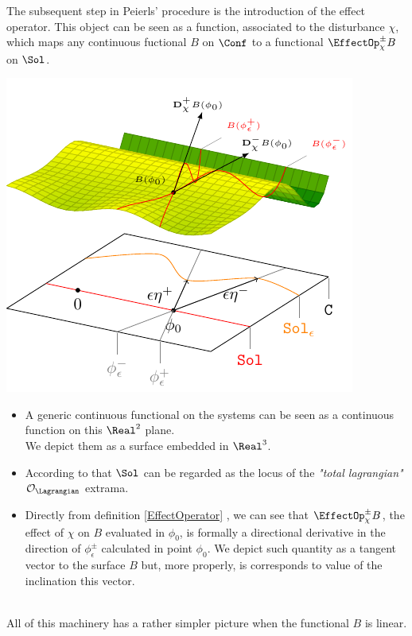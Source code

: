 \documentclass[Main]{subfiles}
\begin{document}
		The subsequent step in Peierls' procedure is the introduction of the effect operator. 
		This object can be seen as a function, associated to the disturbance $\chi$, which maps any continuous fuctional $B$ on $\Conf$ to a functional $\EffectOp_\chi^\pm B$ on $\Sol$. 

		\vspace{1mm}		
		\begin{minipage}{0.5\textwidth}
			\includegraphics[width=\textwidth]{Pictures/GeometricPicture3}
		\end{minipage}
		\begin{minipage}{0.5\textwidth}
			\begin{itemize}
				\item  A generic continuous functional on the systems can be seen as a continuous function on this $\Real^2$ plane. \\ We depict them as a surface embedded in $\Real^3$.
				\item  According to that $\Sol$ can be regarded as the locus of the  \emph{"total lagrangian"} $  \mathcal{O}_\Lagrangian$ extrama.
				\item	Directly from definition \ref{EffectOperator} , we can see that $\EffectOp_\chi^\pm B$, the effect of $\chi$ on $B$ evaluated in $\phi_0$, is formally a directional derivative in the direction of $\phi_\epsilon^\pm$ calculated in point $\phi_0$.
					We depict such quantity as a tangent vector to the surface $B$ but, more properly, is corresponds to value of the inclination this vector.
			\end{itemize}
		\end{minipage}
		\vspace{1mm}\\	
		All of this machinery has a rather simpler picture when the functional $B$ is linear.
\end{document}
